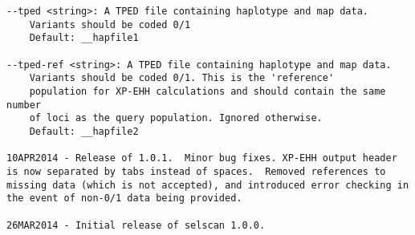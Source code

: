 \documentclass[12pt]{article}%
\begin{document}
\begin{lstlisting}
--tped <string>: A TPED file containing haplotype and map data.
	Variants should be coded 0/1
	Default: __hapfile1

--tped-ref <string>: A TPED file containing haplotype and map data.
	Variants should be coded 0/1. This is the 'reference'
	population for XP-EHH calculations and should contain the same number
	of loci as the query population. Ignored otherwise.
	Default: __hapfile2

10APR2014 - Release of 1.0.1.  Minor bug fixes. XP-EHH output header is now separated by tabs instead of spaces.  Removed references to missing data (which is not accepted), and introduced error checking in the event of non-0/1 data being provided.

26MAR2014 - Initial release of selscan 1.0.0.
\end{lstlisting}


\end{document}
